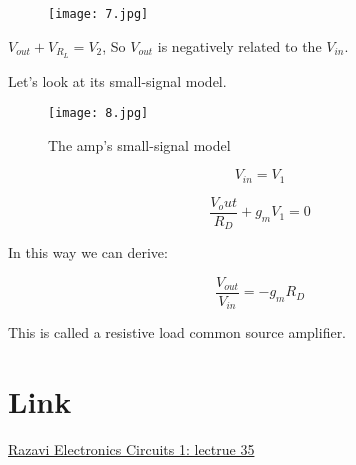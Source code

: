 \documentclass[fontset=windows]{article}
\begin{document}
\begin{figure}[htbp]
    \centering
    \texttt{[image: 7.jpg]}
    \captionsetup{labelformat=empty}
    \caption{}
    \label{7}
\end{figure}

$V_{out}+V_{R_L}=V_2$, So $V_{out}$ is negatively related to the $V_{in}$. 

Let's look at its small-signal model. 

\begin{figure}[htbp]
    \centering
    \texttt{[image: 8.jpg]}
    \captionsetup{labelformat=empty}
    \caption{The amp's small-signal model}
    \label{8}
\end{figure}

$$V_{in}=V_1$$

$$\frac{V_out}{R_D}+g_mV_1=0$$

In this way we can derive: 

$$\frac{V_{out}}{V_{in}}=-g_mR_D$$

This is called a resistive load common source amplifier. 

\section*{Link}

\href{https://www.bilibili.com/video/BV1FD4y1R7Ah?p=35&vd_source=1d0c07486a3bd3b0adb8ac548bf6453e}{Razavi Electronics Circuits 1: lectrue 35}
\end{document}
